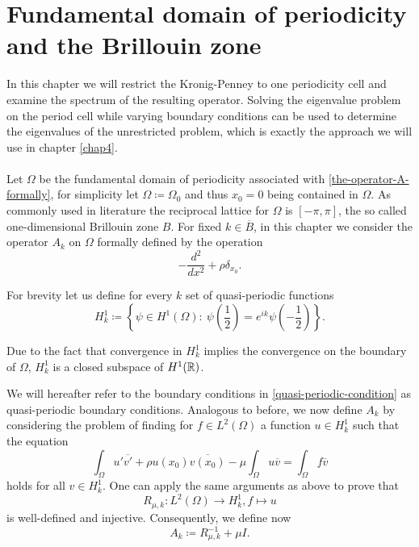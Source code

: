 \chapter{Fundamental domain of periodicity and the Brillouin zone}  \label{chap3}

In this chapter we will restrict the Kronig-Penney to one periodicity cell and examine the spectrum of the resulting operator. Solving the eigenvalue problem on the period cell while varying boundary conditions can be used to determine the eigenvalues of the unrestricted problem, which is exactly the approach we will use in chapter \ref{chap4}.
~\\ ~\\
Let $\Omega$ be the fundamental domain of periodicity associated with \eqref{the-operator-A-formally}, for simplicity let $\Omega \coloneqq \Omega_{0}$ and thus $x_{0} = 0$ being contained in $\Omega$. As commonly used in literature the reciprocal lattice for $\Omega$ is $[-\pi, \pi]$, the so called one-dimensional Brillouin zone $B$. For fixed $k \in \overline{B}$, in this chapter we consider the operator $A_{k}$ on $\Omega$ formally defined by the operation
	\[ -\frac{d^{2}}{dx^{2}} + \rho \delta_{x_{0}}. \]
\begin{definition} 
	For brevity let us define for every $k$ set of quasi-periodic functions  
	\begin{equation}
		H^{1}_{k} \coloneqq \left\{ \psi \in H^{1}(\Omega): ~ \psi\left(\frac{1}{2}\right) = e^{ik} \psi\left(-\frac{1}{2}\right) \right\}. \label{quasi-periodic-condition}
	\end{equation}
\end{definition}	
\begin{remark}
Due to the fact that convergence in $H^{1}_{k}$ implies the convergence on the boundary of $\Omega$, $H^{1}_{k}$ is a closed subspace of $H^{1}(\mathbb{R})$.  %
\end{remark}
We will hereafter refer to the boundary conditions in \eqref{quasi-periodic-condition} as quasi-periodic boundary conditions. Analogous to before, we now define $A_{k}$ by considering the problem of finding for $f \in L^{2}(\Omega)$ a function $u \in H^{1}_{k}$ such that the equation
	\[ \int_{\Omega} u' \overline{v'} + \rho u(x_{0}) \overline{v(x_{0})} - \mu \int_{\Omega} u \overline{v} = \int_{\Omega} f \overline{v} \]
holds for all $v \in H^{1}_{k}$. One can apply the same arguments as above to prove that 
	\[ R_{\mu, k} \colon L^{2}(\Omega) \rightarrow H^{1}_{k}, f \mapsto u \]
is well-defined and injective. Consequently, we define now
	\[ A_{k} \coloneqq R_{\mu, k}^{-1} + \mu I. \] 

